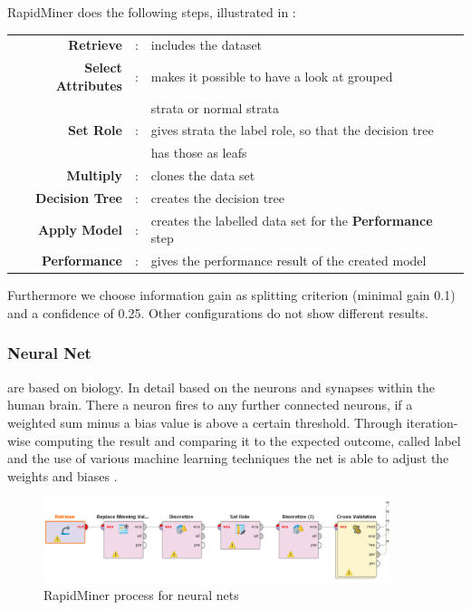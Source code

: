 	RapidMiner does the following steps, illustrated in :
	
	\begin{tabular}{r c l}
		\textbf{Retrieve} & : & includes the dataset\\
		\textbf{Select Attributes} & : & makes it possible to have a look at grouped\\
		&& strata or normal strata\\
		\textbf{Set Role} & : & gives strata the label role, so that the decision tree\\
		&& has those as leafs\\
		\textbf{Multiply} & : & clones the data set \\
		\textbf{Decision Tree} &: & creates the decision tree\\
		\textbf{Apply Model} & : & creates the labelled data set for the \textbf{Performance} step\\
		\textbf{Performance} & : & gives the performance result of the created model\\
	\end{tabular}
	
	Furthermore we choose information gain as splitting criterion (minimal gain 0.1) and a confidence of 0.25. Other configurations do not show different results.
	\vspace*{-1em}

	\subsubsection{Neural Net}
	are based on biology. In detail based on the neurons and synapses within the human brain. There a neuron fires to any further connected neurons, if a weighted sum minus a bias value is above a certain threshold.
	Through iteration-wise computing the result and comparing it to the expected outcome, called label and the use of various machine learning techniques the net is able to adjust the weights and biases \cite{neuralNet}.
	
	\vspace*{-2em}
	\begin{figure}[H]
		\centering
		\includegraphics[width = 0.9\textwidth]{RapidNN.PNG}
		\caption{RapidMiner process for neural nets}
		\vspace*{-1em}
	\end{figure}
	

